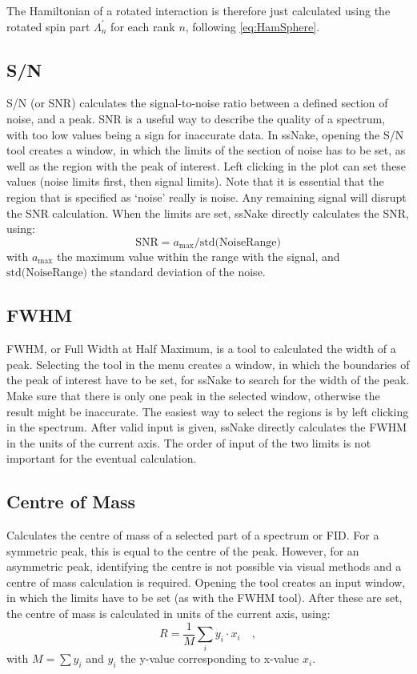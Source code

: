 \documentclass[11pt,a4paper]{article}
\begin{document}
The Hamiltonian of a rotated interaction is therefore just calculated using the rotated spin part
$\Lambda^\prime_n$ for each rank $n$, following \autoref{eq:HamSphere}.



\subsection{S/N}
S/N (or SNR) calculates the signal-to-noise ratio between a defined section of noise, and a peak. SNR is a useful way to describe the quality of a spectrum, with too low values being a sign for inaccurate data. In ssNake, opening the S/N tool creates a window, in which the limits of the section of noise has to be set, as well as the region with the peak of interest. Left clicking in the plot can set these values (noise limits first, then signal limits). Note that it is essential that the region that is specified as `noise' really is noise. Any remaining signal will disrupt the SNR calculation. When the limits are set, ssNake directly calculates the SNR, using:
\begin{equation}
\text{SNR} = a_\text{max} / \text{std(NoiseRange)}
\end{equation}
with $a_\text{max}$ the maximum value within the range with the signal, and $\text{std(NoiseRange)}$ the standard deviation of the noise.

\subsection{FWHM}
FWHM, or Full Width at Half Maximum, is a tool to calculated the width of a peak. Selecting the tool in the menu creates a window, in which the boundaries of the peak of interest have to be set, for ssNake to search for the width of the peak. Make sure that there is only one peak in the selected window, otherwise the result might be inaccurate. The easiest way to select the regions is by left clicking in the spectrum. After valid input is given, ssNake directly calculates the FWHM in the units of the current axis. The order of input of the two limits is not important for the eventual calculation.

\subsection{Centre of Mass}
Calculates the centre of mass of a selected part of a spectrum or FID. For a symmetric peak, this is equal to the centre of the peak. However, for an asymmetric peak, identifying the centre is not possible via visual methods and a centre of mass calculation is required. Opening the tool creates an input window, in which the limits have to be set (as with the FWHM tool). After these are set, the centre of mass is calculated in units of the current axis, using:
\begin{equation}
R = \frac{1}{M} \sum_i y_i \cdot x_i  \quad,
\end{equation}
with $M = \sum y_i$ and $y_i$ the y-value corresponding to x-value $x_i$.
\end{document}
